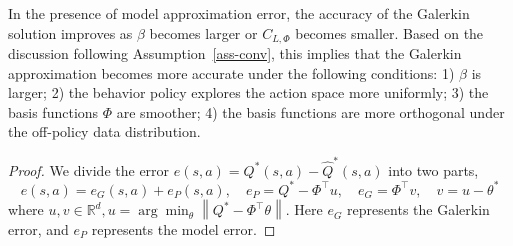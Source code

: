 \documentclass[12pt]{article}
\def\th{\theta}
\def\th{\theta}
\def\R{\mathbb R}
\def\ll{\left\lVert}
\def\rl{\right\rVert}
\begin{document}
In the presence of model approximation error, the accuracy of the Galerkin
solution improves as $\beta$ becomes larger or $C_{L,\Phi}$ becomes smaller.
Based on the discussion following Assumption~\ref{ass-conv}, this implies
that the Galerkin approximation becomes more accurate under the following
conditions: 1) $\beta$ is larger; 2) the behavior policy explores the action space more uniformly; 3) the basis functions $\Phi$ are smoother; 4) the basis functions are more orthogonal under the off-policy data distribution.

\begin{proof}
We divide the error $e(s,a) = Q^*(s,a) - \hat{Q}^*(s,a)$ into two parts, 
\begin{equation}\label{error decomp}
    e(s,a) = e_G(s,a) + e_P(s,a), \quad e_P = Q^* - \Phi^\top u, \quad e_G = \Phi^\top v, \quad v = u - \th^*
\end{equation}
where $u, v\in \R^d, u = \arg\min_{\th}\ll Q^* -\Phi^\top\th \rl$. Here $e_G$ represents the Galerkin error, and $e_P$ represents the model error.  







\end{proof}
\end{document}
